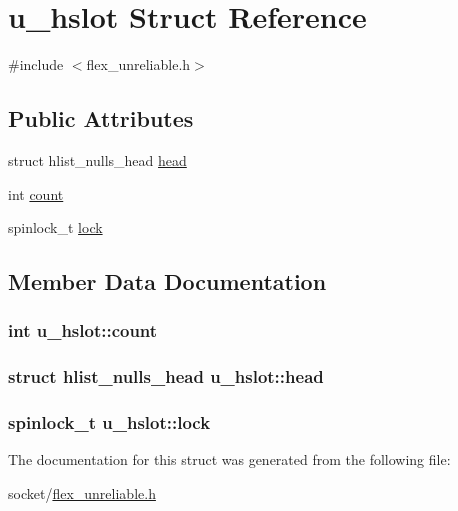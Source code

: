 \hypertarget{structu__hslot}{}\section{u\+\_\+hslot Struct Reference}
\label{structu__hslot}


{\ttfamily \#include $<$flex\+\_\+unreliable.\+h$>$}

\subsection*{Public Attributes}
\begin{DoxyCompactItemize}
\item 
struct hlist\+\_\+nulls\+\_\+head \hyperlink{structu__hslot_abe6060ce741ff9e94d6f4669ec7f4c9a}{head}
\item 
int \hyperlink{structu__hslot_a2eee707762aa72c4d82f24d0422efa19}{count}
\item 
spinlock\+\_\+t \hyperlink{structu__hslot_a3a866b196889821639c6d1aa91af6154}{lock}
\end{DoxyCompactItemize}


\subsection{Member Data Documentation}
\subsubsection[{\texorpdfstring{count}{count}}]{\setlength{\rightskip}{0pt plus 5cm}int u\+\_\+hslot\+::count}\hypertarget{structu__hslot_a2eee707762aa72c4d82f24d0422efa19}{}\label{structu__hslot_a2eee707762aa72c4d82f24d0422efa19}
\subsubsection[{\texorpdfstring{head}{head}}]{\setlength{\rightskip}{0pt plus 5cm}struct hlist\+\_\+nulls\+\_\+head u\+\_\+hslot\+::head}\hypertarget{structu__hslot_abe6060ce741ff9e94d6f4669ec7f4c9a}{}\label{structu__hslot_abe6060ce741ff9e94d6f4669ec7f4c9a}
\subsubsection[{\texorpdfstring{lock}{lock}}]{\setlength{\rightskip}{0pt plus 5cm}spinlock\+\_\+t u\+\_\+hslot\+::lock}\hypertarget{structu__hslot_a3a866b196889821639c6d1aa91af6154}{}\label{structu__hslot_a3a866b196889821639c6d1aa91af6154}


The documentation for this struct was generated from the following file\+:\begin{DoxyCompactItemize}
\item 
socket/\hyperlink{flex__unreliable_8h}{flex\+\_\+unreliable.\+h}\end{DoxyCompactItemize}
